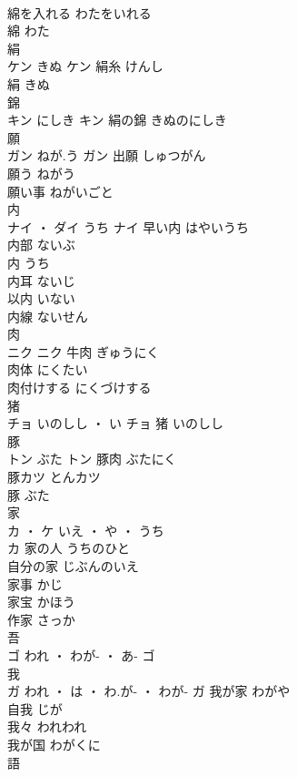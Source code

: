 \documentclass[8pt]{extreport}
\begin{document}
\begin{CJK}{UTF8}{min}
\\	綿を入れる	わたをいれる	
\\	綿	わた	
\\	絹	
\\	ケン	きぬ	ケン	絹糸	けんし	
\\	絹	きぬ	
\\	錦	
\\	キン	にしき	キン													絹の錦	きぬのにしき	
\\	願	
\\	ガン	ねが.う	ガン	出願	しゅつがん	
\\	願う	ねがう	
\\	願い事	ねがいごと	
\\	内	
\\	ナイ ・ ダイ	うち	ナイ	早い内	はやいうち	
\\	内部	ないぶ	
\\	内	うち	
\\	内耳	ないじ	
\\	以内	いない	
\\	内線	ないせん	
\\	肉	
\\	ニク		ニク	牛肉	ぎゅうにく	
\\	肉体	にくたい	
\\	肉付けする	にくづけする	
\\	猪	
\\	チョ	いのしし ・ い	チョ													猪	いのしし	
\\	豚	
\\	トン	ぶた	トン	豚肉	ぶたにく	
\\	豚カツ	とんカツ	
\\	豚	ぶた	
\\	家	
\\	カ ・ ケ	いえ ・ や ・ うち
\\	カ	家の人	うちのひと	
\\	自分の家	じぶんのいえ	
\\	家事	かじ	
\\	家宝	かほう	
\\	作家	さっか	
\\	吾	
\\	ゴ	われ ・ わが- ・ あ-	ゴ																																			
\\	我	
\\	ガ	われ ・ は ・ わ.が- ・ わが-	ガ	我が家	わがや	
\\	自我	じが	
\\	我々	われわれ	
\\	我が国	わがくに	
\\	語	

\end{CJK}
\end{document}
